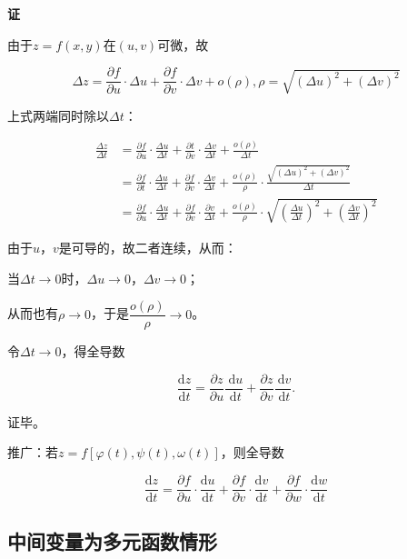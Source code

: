 \documentclass[12pt, a4paper]{article}
\numberwithin{equation}{section}
\newcommand{\rmd}{\mathrm{d}}
\newcommand{\deriv}[2]{\frac{\rmd #1}{\rmd #2}}
\begin{document}
    \textbf{证}

    由于\(z=f\left(x,y\right)\)在\(\left(u,v\right)\)可微，故

    $$
        \Delta z=\frac{\partial f}{\partial u} \cdot \Delta u+\frac{\partial f}{\partial v} \cdot \Delta v+o(\rho), \rho=\sqrt{(\Delta u)^2+(\Delta v)^2}
    $$

    上式两端同时除以\(\Delta t\)：

    $$
        \begin{aligned}
            \frac{\Delta z}{\Delta t} & =\frac{\partial f}{\partial u} \cdot \frac{\Delta u}{\Delta t}+\frac{\partial t}{\partial v} \cdot \frac{\Delta v}{\Delta t}+\frac{o(\rho)}{\Delta t} \\
            & =\frac{\partial f}{\partial t} \cdot \frac{\Delta u}{\Delta t}+\frac{\partial f}{\partial v} \cdot \frac{\Delta v}{\Delta t}+\frac{o(\rho)}{\rho} \cdot \frac{\sqrt{(\Delta u)^2+(\Delta v)^2}}{\Delta t} \\
            & =\frac{\partial f}{\partial u} \cdot \frac{\Delta u}{\Delta t}+\frac{\partial f}{\partial v} \cdot \frac{\partial v}{\Delta t}+\frac{o(\rho)}{\rho} \cdot \sqrt{\left(\frac{\Delta u}{\Delta t}\right)^2+\left(\frac{\Delta v}{\Delta t}\right)^2}
        \end{aligned}
    $$

    由于\(u\)，\(v\)是可导的，故二者连续，从而：

    当\(\Delta t \rightarrow 0\)时，\(\Delta u \rightarrow 0\)，\(\Delta v \rightarrow 0\)；

    从而也有\(\rho \rightarrow 0\)，于是\(\dfrac{o(\rho)}{\rho} \rightarrow 0\)。

    令\(\Delta t \rightarrow 0\)，得全导数

    $$
        \deriv{z}{t}=\frac{\partial z}{\partial u} \frac{\mathrm{~d} u}{\mathrm{~d} t}+\frac{\partial z}{\partial v} \frac{\mathrm{~d} v}{\mathrm{~d} t} .
    $$
    
    证毕。

    推广：若$z=f\left[\varphi(t), \psi(t), \omega(t)\right]$，则全导数

    \begin{equation}
        \deriv{z}{t}=\frac{\partial f}{\partial u} \cdot \deriv{u}{t}+\frac{\partial f}{\partial v} \cdot \deriv{v}{t}+\frac{\partial f}{\partial w} \cdot \deriv{w}{t}
    \end{equation}

\subsection{中间变量为多元函数情形}
\end{document}
